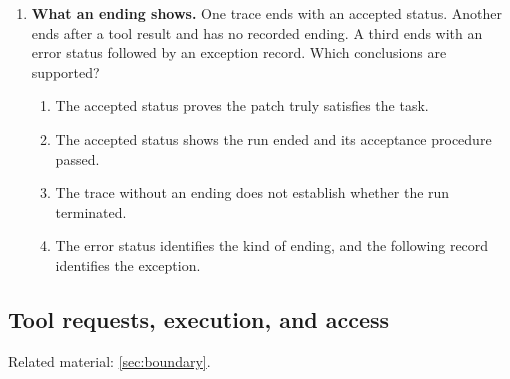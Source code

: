 \begin{enumerate}[start=21,itemsep=0.7\baselineskip]
\item\label{exercise:30} \begin{minipage}[t]{\linewidth}
\textbf{What an ending shows.} One trace ends with an accepted status. Another ends after a tool result and has no recorded ending. A third ends with an error status followed by an exception record. Which conclusions are supported?
\begin{enumerate}[label=\textnormal{(\Alph*)},leftmargin=*,itemsep=0pt]
\item The accepted status proves the patch truly satisfies the task.
\item The accepted status shows the run ended and its acceptance procedure passed.
\item The trace without an ending does not establish whether the run terminated.
\item The error status identifies the kind of ending, and the following record identifies the exception.
\end{enumerate}
\end{minipage}

\end{enumerate}

\subsection{Tool requests, execution, and access}
\noindent Related material: \cref{sec:boundary}.

